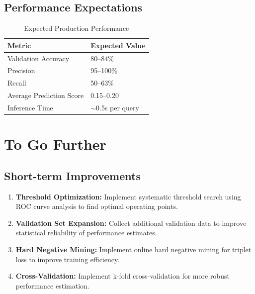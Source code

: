 \documentclass[12pt,a4paper]{article}
\begin{document}
\subsection{Performance Expectations}

\begin{table}[H]
\centering
\caption{Expected Production Performance}
\label{tab:expected_performance}
\begin{tabular}{ll}
\toprule
\textbf{Metric} & \textbf{Expected Value} \\
\midrule
Validation Accuracy & 80--84\% \\
Precision & 95--100\% \\
Recall & 50--63\% \\
Average Prediction Score & 0.15--0.20 \\
Inference Time & $\sim$0.5s per query \\
\bottomrule
\end{tabular}
\end{table}

\section{To Go Further}
\label{sec:future}

\subsection{Short-term Improvements}

\begin{enumerate}
    \item \textbf{Threshold Optimization:} Implement systematic threshold search using ROC curve analysis to find optimal operating points.
    
    \item \textbf{Validation Set Expansion:} Collect additional validation data to improve statistical reliability of performance estimates.
    
    \item \textbf{Hard Negative Mining:} Implement online hard negative mining for triplet loss to improve training efficiency.
    
    \item \textbf{Cross-Validation:} Implement k-fold cross-validation for more robust performance estimation.
\end{enumerate}
\end{document}
